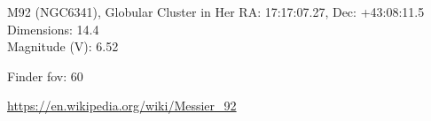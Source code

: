 \begin{block}{M92 (NGC6341), Globular Cluster in Her}
    RA: 17:17:07.27, Dec: +43:08:11.5 \\ 
    Dimensions: 14.4 \\ 
    Magnitude (V): 6.52



    Finder fov: 60 

    \url{https://en.wikipedia.org/wiki/Messier_92} 
\end{block}